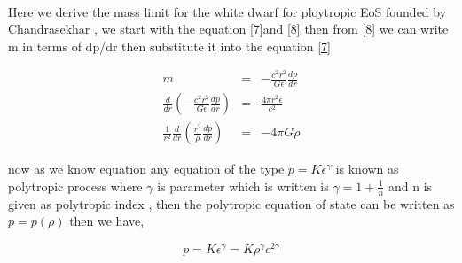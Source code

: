 \documentclass{report}
\begin{document}
\paragraph{}
Here we derive the mass limit for the white dwarf for  ploytropic  EoS founded by Chandrasekhar , we start with the equation \ref{7}and \ref{8} then from \ref{8} we can write m in terms of dp/dr then substitute it into the equation \ref{7}
\begin{center}
\begin{eqnarray}
m & = & -\frac{c^2 r^2}{G\epsilon} \frac{dp}{dr} \nonumber \\
\frac{d}{dr}\left(-\frac{c^2 r^2}{G\epsilon}\frac{dp}{dr} \right)& = & \frac{4\pi r^2 \epsilon}{c^2} \nonumber \\
\frac{1}{r^2} \frac{d}{dr} \left( \frac{r^2}{\rho} \frac{dp}{dr} \right) & = & -4\pi G \rho 
\label{30}
\end{eqnarray}
\end{center}
now as we know equation any equation of the type $ p = K\epsilon ^{\gamma}$ is known as polytropic process where $\gamma$ is parameter  which is written is $\gamma = 1 + \frac{1}{n}$ and n is given as polytropic index , then the polytropic equation of state can be written as $p=p(\rho)$ then we have,
\begin{center}
\begin{equation}
p = K\epsilon ^{\gamma} = K \rho ^{\gamma}c^{2\gamma}
\label{31}
\end{equation}
\end{center}
\newpage
\end{document}
